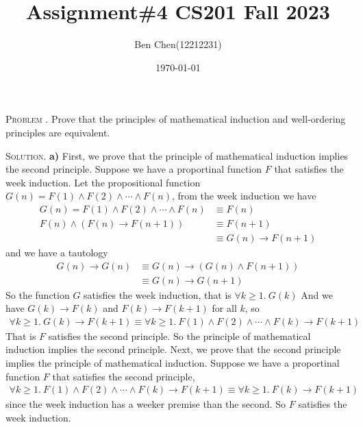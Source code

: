 \documentclass[12pt, a4paper, oneside]{article}
\title{\textbf{Assignment\#4 CS201 Fall 2023}}
\author{Ben Chen(12212231)}
\date{\today}
\newcounter{problemname}
\newenvironment{problem}{\stepcounter{problemname}\par\noindent\textsc{Problem \arabic{problemname}. }}{\\\par}
\newenvironment{solution}{\par\noindent\textsc{Solution. }}{\\\par}
\begin{document}
\maketitle

\begin{problem}
    Prove that the principles of mathematical induction and well-ordering principles are equivalent.
\end{problem}

\begin{solution}
    \textbf{a)} First, we prove that the principle of mathematical induction implies the second principle.
    Suppose we have a proportinal function $F$ that satisfies the week induction.
    Let the propositional function $G(n) = F(1)\wedge F(2) \wedge \cdots \wedge F(n)$, from the week induction we have
    \begin{align*}
        G(n) = F(1)\wedge F(2) \wedge \cdots \wedge F(n) &\equiv F(n) \\
        F(n) \wedge (F(n) \rightarrow F(n+1)) &\equiv F(n+1) \\
        &\equiv G(n) \rightarrow F(n+1)
    \end{align*}
    and we have a tautology
    \begin{align*}
        G(n) \rightarrow G(n) &\equiv G(n) \rightarrow (G(n)\wedge F(n+1)) \\
        &\equiv G(n) \rightarrow G(n+1)
    \end{align*}
    So the function $G$ satisfies the week induction, that is $\forall k\ge 1.\ G(k)$
    \newline And we have $G(k) \rightarrow F(k)$ and $F(k) \rightarrow F(k+1)$ for all $k$, so
    \begin{align*}
        \forall k\ge 1.\ G(k) \rightarrow F(k+1) \equiv \forall k\ge 1.\ F(1)\wedge F(2) \wedge \cdots \wedge F(k) \rightarrow F(k+1)
    \end{align*}
    That is $F$ satisfies the second principle. So the principle of mathematical induction implies the second principle.
    \newline\indent Next, we prove that the second principle implies the principle of mathematical induction.
    Suppose we have a proportinal function $F$ that satisfies the second principle,
    \begin{align*}
        \forall k\ge 1.\ F(1)\wedge F(2) \wedge \cdots \wedge F(k) \rightarrow F(k+1) \equiv \forall k\ge 1.\ F(k) \rightarrow F(k+1)
    \end{align*}
    since the week induction has a weeker premise than the second. So $F$ satisfies the week induction.

\end{solution}
\end{document}
